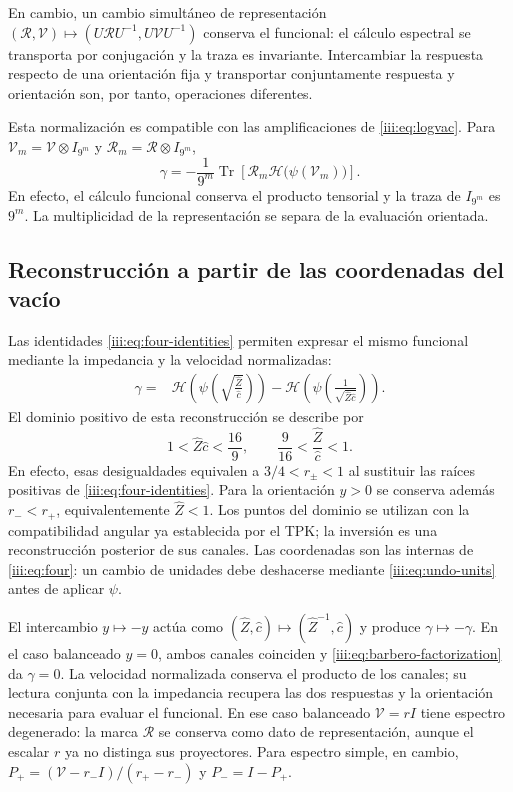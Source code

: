 En cambio, un cambio simultáneo de representación
$(\mathcal R,\mathcal V)\mapsto
(U\mathcal RU^{-1},U\mathcal VU^{-1})$ conserva el funcional:
el cálculo espectral se transporta por conjugación y la traza es
invariante. Intercambiar la respuesta respecto de una orientación fija
y transportar conjuntamente respuesta y orientación son, por tanto,
operaciones diferentes.

Esta normalización es compatible con las amplificaciones de
\eqref{iii:eq:logvac}. Para
$\mathcal V_m=\mathcal V\otimes I_{9^m}$ y
$\mathcal R_m=\mathcal R\otimes I_{9^m}$,
\begin{equation}
 \gamma=-\frac1{9^m}\operatorname{Tr}
 \left[\mathcal R_m\mathcal H\bigl(\psi(\mathcal V_m)\bigr)\right].
 \label{iii:eq:barbero-amplification}
\end{equation}
En efecto, el cálculo funcional conserva el producto tensorial y la traza
de $I_{9^m}$ es $9^m$. La multiplicidad de la representación se separa
de la evaluación orientada.

\subsection{Reconstrucción a partir de las coordenadas del vacío}

Las identidades \eqref{iii:eq:four-identities} permiten expresar el mismo
funcional mediante la impedancia y la velocidad normalizadas:
\begin{align}
 \gamma={}&
 \mathcal H\!\left(\psi\!\left(
     \sqrt{\frac{\widehat Z}{\widehat c}}\right)\right)
 -\mathcal H\!\left(\psi\!\left(
     \frac1{\sqrt{\widehat Z\widehat c}}\right)\right).
 \label{iii:eq:barbero-zc}
\end{align}
El dominio positivo de esta reconstrucción se describe por
\begin{equation}
 1<\widehat Z\widehat c<\frac{16}{9},\qquad
 \frac9{16}<\frac{\widehat Z}{\widehat c}<1.
 \label{iii:eq:barbero-zc-domain}
\end{equation}
En efecto, esas desigualdades equivalen a
$3/4<r_\pm<1$ al sustituir las raíces positivas de
\eqref{iii:eq:four-identities}. Para la orientación $y>0$ se conserva
además $r_-<r_+$, equivalentemente $\widehat Z<1$. Los puntos del
dominio se utilizan con la compatibilidad angular ya establecida por
el TPK; la inversión es una reconstrucción posterior de sus canales.
Las coordenadas son las internas de \eqref{iii:eq:four}: un cambio de
unidades debe deshacerse mediante \eqref{iii:eq:undo-units} antes de
aplicar $\psi$.

El intercambio $y\mapsto-y$ actúa como
$(\widehat Z,\widehat c)\mapsto(\widehat Z^{-1},\widehat c)$ y
produce $\gamma\mapsto-\gamma$. En el caso balanceado $y=0$,
ambos canales coinciden y \eqref{iii:eq:barbero-factorization} da
$\gamma=0$. La velocidad normalizada conserva el producto de los
canales; su lectura conjunta con la impedancia recupera las dos
respuestas y la orientación necesaria para evaluar el funcional.
En ese caso balanceado $\mathcal V=rI$ tiene espectro degenerado:
la marca $\mathcal R$ se conserva como dato de representación, aunque
el escalar $r$ ya no distinga sus proyectores. Para espectro simple,
en cambio,
$P_+=(\mathcal V-r_-I)/(r_+-r_-)$ y $P_-=I-P_+$.
